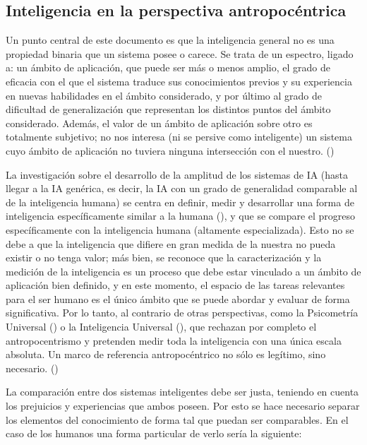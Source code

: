 \subsection{Inteligencia en la perspectiva antropocéntrica}

Un punto central de este documento es que la inteligencia general no es una propiedad binaria que un sistema posee o carece. Se trata de un espectro, ligado a: un ámbito de aplicación, que puede ser más o menos amplio, el grado de eficacia con el que el sistema traduce sus conocimientos previos y su experiencia en nuevas habilidades en el ámbito considerado, y por último al grado de dificultad de generalización que representan los distintos puntos del ámbito considerado. Además, el valor de un ámbito de aplicación sobre otro es totalmente subjetivo; no nos interesa (ni se persive como inteligente) un sistema cuyo ámbito de aplicación no tuviera ninguna intersección con el nuestro. (\cite{chollet2019measure})

La investigación sobre el desarrollo de la amplitud de los sistemas de IA (hasta llegar a la IA genérica, es decir, la IA con un grado de generalidad comparable al de la inteligencia humana) se centra en definir, medir y desarrollar una forma de inteligencia específicamente similar a la humana (\cite{goertzel2012architecture}), y que se compare el progreso específicamente con la inteligencia humana (altamente especializada). Esto no se debe a que la inteligencia que difiere en gran medida de la nuestra no pueda existir o no tenga valor; más bien, se reconoce que la caracterización y la medición de la inteligencia es un proceso que debe estar vinculado a un ámbito de aplicación bien definido, y en este momento, el espacio de las tareas relevantes para el ser humano es el único ámbito que se puede abordar y evaluar de forma significativa. Por lo tanto, al contrario de otras perspectivas, como la Psicometría Universal (\cite{hernandez2014universal}) o la Inteligencia Universal (\cite{legg2007universal}), que rechazan por completo el antropocentrismo y pretenden medir toda la inteligencia con una única escala absoluta. Un marco de referencia antropocéntrico no sólo es legítimo, sino necesario. (\cite{chollet2019measure})

La comparación entre dos sistemas inteligentes debe ser justa, teniendo en cuenta los prejuicios y experiencias que ambos poseen. Por esto se hace necesario separar los elementos del conocimiento de forma tal que puedan ser comparables. En el caso de los humanos una forma particular de verlo sería la siguiente:

